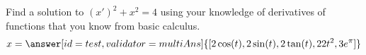 \documentclass{ximera}
\begin{document}
\begin{exercise}
    Find a solution to ${(x')}^2 + x^2 = 4$ using your knowledge of derivatives of functions that you know from basic calculus.
    \[
        x = \answer[id=test,validator=multiAns]{[2\cos(t),2\sin(t),2\tan(t),22t^2,3e^\pi]}%
    \]
\end{exercise}






\end{document}
